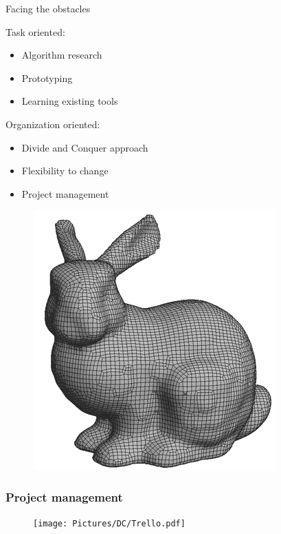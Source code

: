 \begin{frame}{Facing the obstacles}
\begin{minipage}{1\linewidth}
\begin{multicols}{2}
Task oriented:
\begin{itemize}
\item Algorithm research 
\item Prototyping
\item Learning existing tools
\end{itemize}
\columnbreak
Organization oriented:
\begin{itemize}
\item Divide and Conquer approach
\item Flexibility to change
\item Project management
\end{itemize}
\end{multicols}
\end{minipage}

\begin{minipage}{1\linewidth}
\hspace{5 mm}
\begin{figure}
	\includegraphics[scale=0.35]{Pictures/FirstHalf/sf_bunny.png}
\end{figure}
\end{minipage}

\end{frame}


\begin{frame}

	\frametitle{Project management}

	\begin{figure}
	\texttt{[image: Pictures/DC/Trello.pdf]}
	\end{figure}
	
\end{frame}


